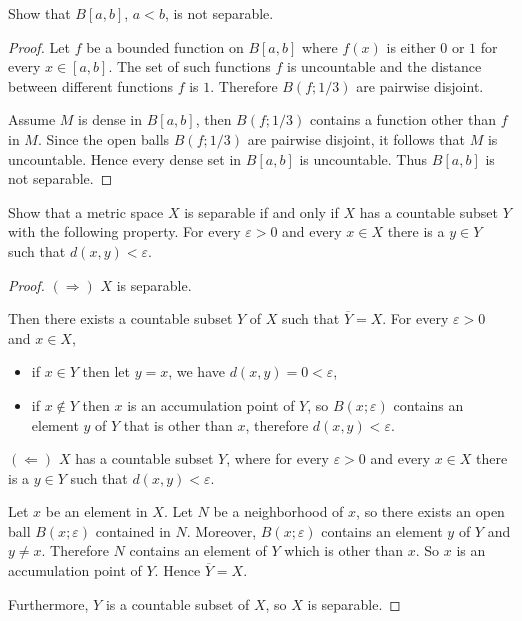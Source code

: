 \begin{exercise}\label{chapter1:section3:exercise12}
    Show that $B[a, b]$, $a < b$, is not separable.
\end{exercise}

\begin{proof}
    Let $f$ be a bounded function on $B[a, b]$ where $f(x)$ is either $0$ or $1$ for every $x\in [a, b]$. The set of such functions $f$ is uncountable and the distance between different functions $f$ is $1$. Therefore $B(f; 1/3)$ are pairwise disjoint.

    Assume $M$ is dense in $B[a, b]$, then $B(f; 1/3)$ contains a function other than $f$ in $M$. Since the open balls $B(f; 1/3)$ are pairwise disjoint, it follows that $M$ is uncountable. Hence every dense set in $B[a, b]$ is uncountable. Thus $B[a, b]$ is not separable.
\end{proof}

\begin{exercise}\label{chapter1:section3:exercise13}
    Show that a metric space $X$ is separable if and only if $X$ has a countable subset $Y$ with the following property. For every $\varepsilon > 0$ and every $x \in X$ there is a $y\in Y$ such that $d(x, y) < \varepsilon$.
\end{exercise}

\begin{proof}
    $(\Rightarrow)$ $X$ is separable.

    Then there exists a countable subset $Y$ of $X$ such that $\overline{Y} = X$. For every $\varepsilon > 0$ and $x\in X$,
    \begin{itemize}
        \item if $x\in Y$ then let $y = x$, we have $d(x, y) = 0 < \varepsilon$,
        \item if $x\notin Y$ then $x$ is an accumulation point of $Y$, so $B(x; \varepsilon)$ contains an element $y$ of $Y$ that is other than $x$, therefore $d(x, y) < \varepsilon$.
    \end{itemize}

    $(\Leftarrow)$ $X$ has a countable subset $Y$, where for every $\varepsilon > 0$ and every $x \in X$ there is a $y\in Y$ such that $d(x, y) < \varepsilon$.

    Let $x$ be an element in $X$. Let $N$ be a neighborhood of $x$, so there exists an open ball $B(x;\varepsilon)$ contained in $N$. Moreover, $B(x; \varepsilon)$ contains an element $y$ of $Y$ and $y\ne x$. Therefore $N$ contains an element of $Y$ which is other than $x$. So $x$ is an accumulation point of $Y$. Hence $\overline{Y} = X$.

    Furthermore, $Y$ is a countable subset of $X$, so $X$ is separable.
\end{proof}


